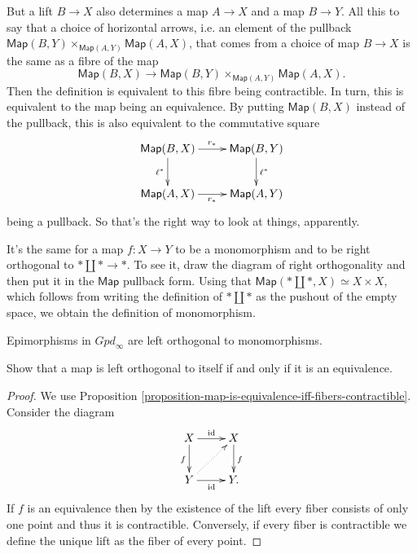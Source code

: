 But a lift $B \to X$ also determines
a map $A \to X$ and 
a map $B \to Y$.
All this to say that 
a choice of horizontal arrows,
i.e. an element of the pullback
$\mathsf{Map}(B,Y) \times_{\mathsf{Map}(A,Y)}\mathsf{Map}(A,X)$,
that comes from a choice of map
$B \to X$ is the same as 
a fibre of the map
$$
\mathsf{Map}(B,X) \to 
\mathsf{Map}(B,Y) \times_{\mathsf{Map}(A,Y)}\mathsf{Map}(A,X).
$$
Then the definition is equivalent
to this fibre being contractible.
In turn, this is equivalent to the
map being an equivalence.
By putting $\mathsf{Map}(B,X)$ instead
of the pullback, this is also equivalent
to the commutative square
$$
\xymatrix{
\mathsf{Map}(B,X)\ar[r]^{r_*}\ar[d]_{\ell^*}&\mathsf{Map}(B,Y)\ar[d]^{\ell^*}\\
\mathsf{Map}(A,X)\ar[r]_{r_*}&\mathsf{Map}(A,Y)
}
$$
being a pullback. So that's the
right way to look at things, apparently.

\begin{example}
\label{example-monomorphism-iff-right-orthogonal-to-pushout}
It's the same for a map $f:X \to Y$ to be
a monomorphism and to be
right orthogonal to $* \amalg * \to *$.
To see it, draw the diagram of right orthogonality
and then put it in the $\mathsf{Map}$ pullback form.
Using that $\mathsf{Map}(* \amalg *,X)\simeq X\times X$,
which follows from writing the
definition of $* \amalg *$ as the pushout of
the empty space, we obtain the definition of
monomorphism.
\end{example}


\begin{lemma}
\label{lemma-epimorphisms-are-left-orthogonal-to-monomorphisms}
Epimorphisms in $\mathit{Gpd}_\infty$ are left orthogonal to
monomorphisms.
\end{lemma}

\begin{exercise}
\label{exercise-2.11}
Show that a map is left orthogonal
to itself if and only if it is an equivalence.
\end{exercise}

\begin{proof}
We use Proposition 
\ref{proposition-map-is-equivalence-iff-fibers-contractible}.
Consider the diagram
$$
\xymatrix{
X\ar[r]^{\text{id}}\ar[d]_{f}&X\ar[d]^{f}\\
Y\ar[r]_{\text{id}}\ar@{.>}[ur]&Y.
}
$$
If $f$ is an equivalence then 
by the existence of the lift
every fiber consists of only one point and
thus it is contractible.
Conversely, if every fiber is contractible
we define the unique lift as the fiber of every point.
\end{proof}

